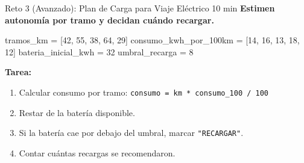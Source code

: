 \documentclass[aspectratio=169, 11pt]{beamer}
\begin{document}
\begin{frame}[fragile,shrink=28]{Reto 3 (Avanzado): Plan de Carga para Viaje Eléctrico \hfill {\normalsize\color{arcaRed}\faClock\hspace{4pt}10 min}}
  \vspace{-6pt}
  {\small\color{arcaDark}\bfseries
    Estimen autonomía por tramo y decidan cuándo recargar.}

  \vspace{4pt}
  \begin{pyblock}
tramos_km = [42, 55, 38, 64, 29]
consumo_kwh_por_100km = [14, 16, 13, 18, 12]
bateria_inicial_kwh = 32
umbral_recarga = 8
  \end{pyblock}

  \vspace{2pt}
  {\footnotesize\color{textMuted}
    \textbf{Tarea:}
    \begin{enumerate}\setlength{\itemsep}{2pt}
      \item Calcular consumo por tramo:
      \texttt{consumo = km * consumo\_100 / 100}
      \item Restar de la batería disponible.
      \item Si la batería cae por debajo del umbral,
      marcar \texttt{"RECARGAR"}.
      \item Contar cuántas recargas se recomendaron.
    \end{enumerate}
  }
\end{frame}
\end{document}
